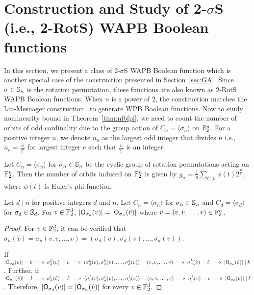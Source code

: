 \documentclass{llncs}
\begin{document}
\section{Construction and Study of 2-$\sigma$S (i.e., 2-RotS) WAPB Boolean functions}\label{sec:2RotS}

In this section, we present a class of 2-$\sigma$S WAPB Boolean function which is another special case of the construction presented in Section~\ref{sec:GA}. Since $\sigma \in \mathbb{S}_n$ is the rotation permutation, these functions are also known as 2-RotS WAPB Boolean functions. When $n$ is a power of $2$, the construction matches the Liu-Mesnager construction~\cite{DCC:LiuMes19} to generate WPB Boolean functions. Now to study nonlinearity bound in Theorem~\ref{thm:nlbfpi}, we need to count the number of orbits of odd cardinality due to the group action of $C_n = \langle \sigma_n \rangle$ on $\mathbb{F}_2^n$. For a positive integer $n$, we denote $n_o$ as the largest odd integer that divides $n$ i.e., $n_o = \frac{n}{2^e}$ for largest integer $e$ such that $\frac{n}{2^e}$ is an integer.

\begin{proposition}\label{prop:no_orb}
Let $C_n = \langle \sigma_n \rangle$ for $\sigma_n \in \mathbb{S}_n$ be the cyclic group of rotation permutations acting on $\mathbb{F}_2^n$. Then the number of orbits induced on $\mathbb{F}_2^n$ is given by $g_n= \frac{1}{n} \sum\limits_{t \mid n} \phi(t)2^{\frac{n}{t}}$, where $\phi(t)$ is Euler's phi-function. 
\end{proposition}

\begin{lemma}\label{lem:orb_d}
Let $d \mid n$ for positive integers $d$ and $n$. Let $C_n= \langle \sigma_n \rangle$ for $\sigma_n \in \mathbb{S}_n$ and $C_d = \langle \sigma_d \rangle$ for $\sigma_d \in \mathbb{S}_d$. For $v \in \mathbb{F}_2^d$, $|\mathsf{O}_{\sigma_d}(v)| = |\mathsf{O}_{\sigma_n}(\hat{v})|$ where $\hat{v} = (v,v,\ldots,v) \in \mathbb{F}_2^n$.  
\end{lemma}
\begin{proof}
For $v \in \mathbb{F}_2^d$, it can be verified that $\sigma_n(\hat{v}) = \sigma_n(v,v,\ldots,v) = (\sigma_d(v),\sigma_d(v),\ldots,\sigma_d(v))$.

If $|\mathsf{O}_{\sigma_d}(v)| = k \implies \sigma_d^k(v) = v \implies (\sigma_d^k(v),\sigma_d^k(v),\ldots,\sigma_d^k(v)) = (v,v,\ldots,v) \implies \sigma_n^k(\hat{v}) = \hat{v} \implies |\mathsf{O}_{\sigma_n}(\hat{v})| \mid k$.
Further, if $|\mathsf{O}_{\sigma_n}(\hat{v})| = l \implies \sigma_n^l(\hat{v}) = \hat{v} \implies (\sigma_d^l(v),\sigma_d^l(v),\ldots,\sigma_d^l(v)) = (v,v,\ldots,v)
\implies \sigma_d^l(v) = v \implies |\mathsf{O}_{\sigma_d}(v)| \mid l$.
Therefore, $|\mathsf{O}_{\sigma_d}(v)| = |\mathsf{O}_{\sigma_n}(\hat{v})|$ for every $v \in \mathbb{F}_2^d$.
\end{proof}
\end{document}
